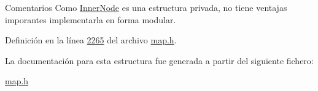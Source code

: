 \begin{DoxyRemark}{Comentarios}
Como \hyperlink{structaed2_1_1map_1_1InnerNode}{Inner\+Node} es una estructura privada, no tiene ventajas imporantes implementarla en forma modular. 
\end{DoxyRemark}


Definición en la línea \hyperlink{map_8h_source_l02265}{2265} del archivo \hyperlink{map_8h_source}{map.\+h}.



La documentación para esta estructura fue generada a partir del siguiente fichero\+:\begin{DoxyCompactItemize}
\item 
\hyperlink{map_8h}{map.\+h}\end{DoxyCompactItemize}
